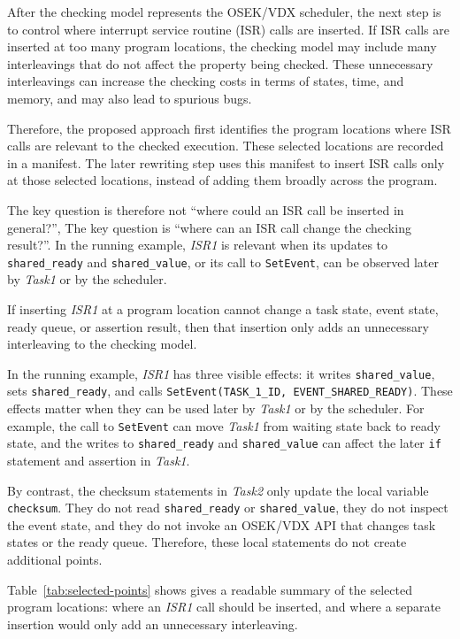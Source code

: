 After the checking model represents the OSEK/VDX scheduler, the next step is to control where interrupt service routine (ISR) calls are inserted. If ISR calls are inserted at too many program locations, the checking model may include many interleavings that do not affect the property being checked. These unnecessary interleavings can increase the checking costs in terms of states, time, and memory, and may also lead to spurious bugs.

Therefore, the proposed approach first identifies the program locations where ISR calls are relevant to the checked execution. These selected locations are recorded in a manifest. The later rewriting step uses this manifest to insert ISR calls only at those selected locations, instead of adding them broadly across the program.

The key question is therefore not ``where could an ISR call be inserted in general?'', The key question is ``where can an ISR call change the checking result?''. In the running example, \textit{ISR1} is relevant when its updates to \texttt{shared\_ready} and \texttt{shared\_value}, or its call to \texttt{SetEvent}, can be observed later by \textit{Task1} or by the scheduler.

If inserting \textit{ISR1} at a program location cannot change a task state, event state, ready queue, or assertion result, then that insertion only adds an unnecessary interleaving to the checking model.

In the running example, \textit{ISR1} has three visible effects: it writes \texttt{shared\_value}, sets \texttt{shared\_ready}, and calls \texttt{SetEvent(TASK\_1\_ID, EVENT\_SHARED\_READY)}. These effects matter when they can be used later by \textit{Task1} or by the scheduler. For example, the call to \texttt{SetEvent} can move \textit{Task1} from waiting state back to ready state, and the writes to \texttt{shared\_ready} and \texttt{shared\_value} can affect the later \texttt{if} statement and assertion in \textit{Task1}.

By contrast, the checksum statements in \textit{Task2} only update the local variable \texttt{checksum}. They do not read \texttt{shared\_ready} or \texttt{shared\_value}, they do not inspect the event state, and they do not invoke an OSEK/VDX API that changes task states or the ready queue. Therefore, these local statements do not create additional points.

Table~\ref{tab:selected-points} shows gives a readable summary of the selected program locations: where an \textit{ISR1} call should be inserted, and where a separate insertion would only add an unnecessary interleaving.

